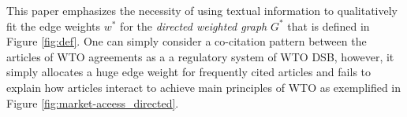 This paper emphasizes the necessity of using textual information 
to qualitatively fit the edge weights $w^*$ for the \textit{directed weighted graph} $G^*$ that is defined in Figure \ref{fig:def}. 
One can simply consider a co-citation pattern between the articles of WTO agreements as a a regulatory system of WTO DSB, however,
it simply allocates a huge edge weight for frequently cited articles and fails to explain how articles interact to achieve main principles of WTO as exemplified in Figure \ref{fig:market-aceess_directed}.






